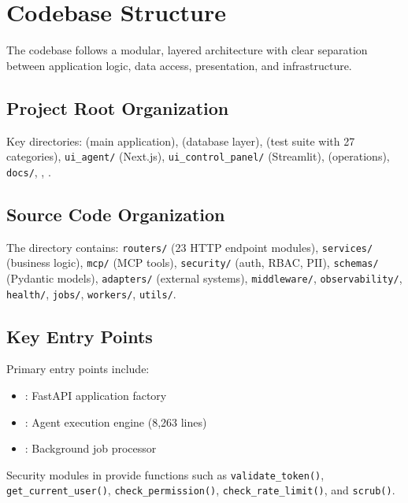 \documentclass[a4paper,twoside]{sapthesis}
\begin{document}
\section{Codebase Structure}
\label{sec:codebase}

The codebase follows a modular, layered architecture with clear separation between application logic, data access, presentation, and infrastructure.

\subsection{Project Root Organization}

Key directories:  (main application),  (database layer),  (test suite with 27 categories), \texttt{ui\_agent/} (Next.js), \texttt{ui\_control\_panel/} (Streamlit),  (operations), \texttt{docs/}, , .

\subsection{Source Code Organization}

The  directory contains: \texttt{routers/} (23 HTTP endpoint modules), \texttt{services/} (business logic), \texttt{mcp/} (MCP tools), \texttt{security/} (auth, RBAC, PII), \texttt{schemas/} (Pydantic models), \texttt{adapters/} (external systems), \texttt{middleware/}, \texttt{observability/}, \texttt{health/}, \texttt{jobs/}, \texttt{workers/}, \texttt{utils/}.

\subsection{Key Entry Points}
\label{subsec:key-entry-points}

Primary entry points include:
\begin{itemize}
    \item {}: FastAPI application factory
    \item {}: Agent execution engine (8,263 lines)
    \item {}: Background job processor
\end{itemize}

Security modules in  provide functions such as \texttt{validate\_token()}, \texttt{get\_current\_user()}, \texttt{check\_permission()}, \texttt{check\_rate\_limit()}, and \texttt{scrub()}.
\end{document}
